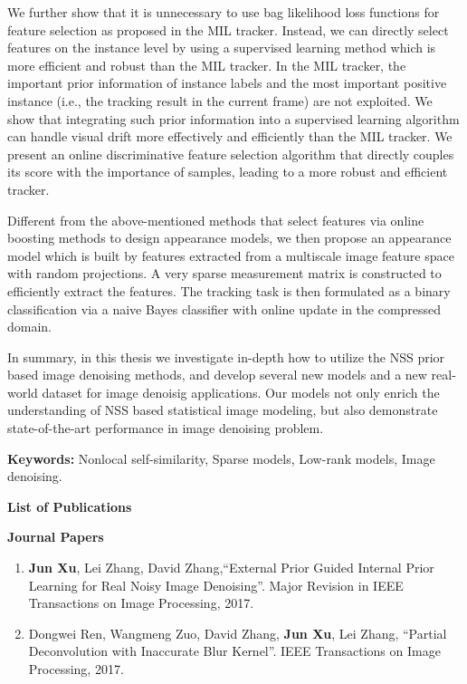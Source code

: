 \documentclass[12pt,oneside]{report}
\numberwithin{figure}{chapter}
\newenvironment{preliminary}%
{\pagestyle{plain}\pagenumbering{roman}}%
{\pagenumbering{arabic}}
\begin{document}
\begin{preliminary}
%
We further show that it is unnecessary to use bag likelihood loss functions for feature selection as proposed in the MIL tracker. Instead, we can directly select features on the instance level by using a supervised learning method which is more efficient and robust than the MIL tracker. In the MIL tracker, the important prior information of instance labels and the most important positive instance (i.e., the tracking result in the current frame) are not exploited. We show that integrating such prior information into a
supervised learning algorithm can handle visual drift more effectively and efficiently than the MIL tracker. We present an online discriminative feature selection algorithm that directly couples its score with the importance of samples, leading to a more robust and efficient tracker.
%

%
Different from the above-mentioned methods that select features via online boosting methods to design appearance models, we then propose an appearance model which is built by features extracted from a multiscale image feature space with random projections. A very sparse measurement matrix is constructed to efficiently extract the features. The tracking task is then formulated as a binary classification via a naive Bayes classifier with online update in the compressed domain.

In summary, in this thesis we investigate in-depth how to utilize the NSS prior based image denoising methods, and develop several new models and a new real-world dataset for image denoisig applications. Our models not only enrich the understanding of NSS based statistical image modeling, but also demonstrate state-of-the-art performance
in image denoising problem.

\textbf{Keywords:} Nonlocal self-similarity, Sparse models, Low-rank models, Image denoising.

\newpage
{}
\Large\begin{center}\textbf{List of Publications}\end{center}\normalsize

\textbf{Journal Papers}
\begin{enumerate}
 \item \textbf{Jun Xu}, Lei Zhang, David Zhang,``External Prior Guided Internal Prior Learning for Real Noisy Image Denoising''. Major Revision in IEEE Transactions on Image Processing, 2017.
  \item Dongwei Ren, Wangmeng Zuo, David Zhang, \textbf{Jun Xu}, Lei Zhang, ``Partial Deconvolution with Inaccurate Blur Kernel''. IEEE Transactions on Image Processing, 2017. 


\end{enumerate}
\end{preliminary}
\end{document}
